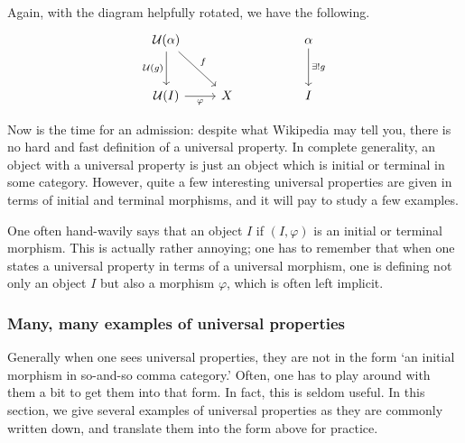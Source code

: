 \documentclass[notes.tex]{subfiles}
\begin{document}
Again, with the diagram helpfully rotated, we have the following.
\begin{equation*}
  \begin{tikzcd}[row sep=large]
    \mathcal{U}(\alpha) \arrow[d, swap, "\mathcal{U}(g)"] \arrow[rd, "f"] & & & \alpha \arrow[d, "\exists!g"]\\
    \mathcal{U}(I) \arrow[r, swap, "\varphi"] & X & & I
  \end{tikzcd}
\end{equation*}
\begin{definition}
  \label{def:universalproperty}
  Now is the time for an admission: despite what Wikipedia may tell you, there is no hard and fast definition of a universal property. In complete generality, an object with a universal property is just an object which is initial or terminal in some category. However, quite a few interesting universal properties are given in terms of initial and terminal morphisms, and it will pay to study a few examples.
\end{definition}

\begin{note}
  One often hand-wavily says that an object $I$  if $(I, \varphi)$ is an initial or terminal morphism. This is actually rather annoying; one has to remember that when one states a universal property in terms of a universal morphism, one is defining not only an object $I$ but also a morphism $\varphi$, which is often left implicit.
\end{note}


\subsubsection{Many, many examples of universal properties}

Generally when one sees universal properties, they are not in the form `an initial morphism in so-and-so comma category.' Often, one has to play around with them a bit to get them into that form. In fact, this is seldom useful. In this section, we give several examples of universal properties as they are commonly written down, and translate them into the form above for practice.
\end{document}
